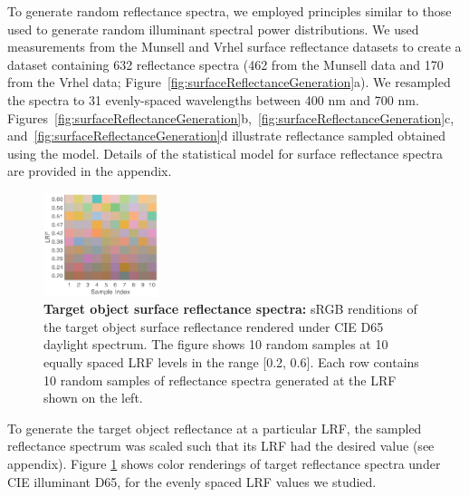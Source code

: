 \documentclass{jov}
\begin{document}
To generate random reflectance spectra, we employed principles similar to those used to generate random illuminant spectral power distributions.
We used measurements from the Munsell \cite{kelly1943tristimulus} and Vrhel \cite{vrhel1994measurement} surface reflectance datasets to create a dataset containing 632 reflectance spectra (462 from the Munsell data and 170 from the Vrhel data; Figure~\ref{fig:surfaceReflectanceGeneration}a).
We resampled the spectra to 31 evenly-spaced wavelengths between 400 nm and 700 nm.
Figures~\ref{fig:surfaceReflectanceGeneration}b,~\ref{fig:surfaceReflectanceGeneration}c, and~\ref{fig:surfaceReflectanceGeneration}d illustrate reflectance sampled obtained using the model. 
Details of the statistical model for surface reflectance spectra are provided in the appendix. 

\begin{figure}
\centering
\includegraphics[width=0.3\textwidth]{Figure8.eps}
\caption{{\bf Target object surface reflectance spectra:} sRGB renditions of the target object surface reflectance rendered under CIE D65 daylight spectrum. The figure shows 10 random samples at 10 equally spaced LRF levels in the range [0.2, 0.6]. Each row contains 10 random samples of reflectance spectra generated at the LRF shown on the left.}
\label{fig:targetSwatches}
\end{figure}

To generate the target object reflectance at a particular LRF, the sampled reflectance spectrum was 
scaled such that its LRF had the desired value (see appendix).
Figure \ref{fig:targetSwatches} shows color renderings of target reflectance spectra under CIE illuminant D65, for the evenly spaced LRF values we studied.
\end{document}
